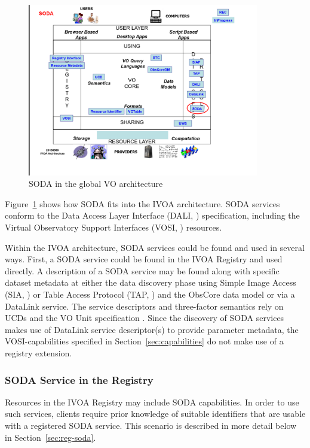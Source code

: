 \documentclass[11pt,a4paper]{ivoa}
\begin{document}
\begin{figure}
\centering

\includegraphics[width=0.9\textwidth]{archdiag.png}
\caption{SODA in the global VO architecture}
\label{fig:architecture}
\end{figure}

Figure~\ref{fig:architecture} shows how SODA fits into the IVOA architecture.
SODA services conform to the Data Access Layer Interface (DALI,
\citet{std:DALI}) specification, 
including the Virtual Observatory Support Interfaces (VOSI,
\citet{std:VOSI}) resources.

Within the IVOA architecture, SODA services could be found and used in
several ways. First, a SODA service could be found in the IVOA Registry
and used directly. A description of a SODA service may be found along
with specific dataset metadata at either the data discovery phase using
Simple Image Access (SIA, \citet{std:SIAv2}) or Table Access Protocol
(TAP, \citet{std:TAP}) and the ObsCore data model \citep{std:OBSCORE} or
via a DataLink \citep{std:DataLink} service. The service descriptors and
three-factor semantics rely on UCDs \citep{std:UCD} and the VO Unit
specification \citep{std:VOUNIT}. Since the discovery of SODA services
makes use of DataLink service descriptor(s) to provide parameter
metadata, the VOSI-capabilities specified in
Section~\ref{sec:capabilities} do not make use of a registry extension.

\subsubsection{SODA Service in the Registry}

Resources in the IVOA Registry may include SODA capabilities. In order to
use such services, clients require prior knowledge of suitable
identifiers that are usable with a registered SODA service. This
scenario is described in more detail below in
Section~\ref{sec:reg-soda}.
\end{document}
